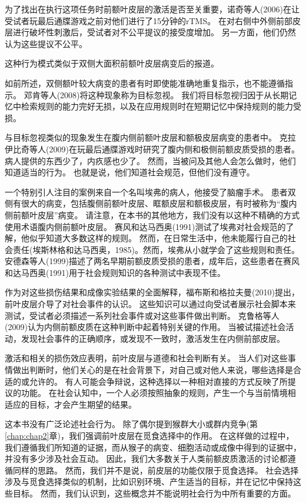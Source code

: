 为了找出在执行这项任务时前额叶皮层的激活是否至关重要，诺奇等人(2006)在让受试者玩最后通牒游戏之前对他们进行了15分钟的rTMS。
在对右侧中外侧前部皮层进行破坏性刺激后，受试者对不公平提议的接受度增加。
另一方面，他们仍然认为这些提议不公平。


这种行为模式类似于双侧大面积前额叶皮层病变后的报道。


如前所述，双侧额叶较大病变的患者有时即使能准确地重复指示，也不能遵循指示。
邓肯等人(2008)将这种现象称为目标忽视。
我们将目标忽视归因于从长期记忆中检索规则的能力完好无损，以及在应用规则时在短期记忆中保持规则的能力受损。


与目标忽视类似的现象发生在腹内侧前额叶皮层和额极皮层病变的患者中。
克拉伊比奇等人(2009)在玩最后通牒游戏时研究了腹内侧和极侧前额皮质受损的患者。
病人提供的东西少了，内疚感也少了。
然而，当被问及其他人会怎么做时，他们知道适当的行为。
也就是说，他们知道社会规范，但他们没有遵守。


一个特别引人注目的案例来自一个名叫埃弗的病人，他接受了脑瘤手术。
患者双侧有很大的病变，包括腹侧前额叶皮层、眶额皮层和额极皮层，有时被称为“腹内侧前额叶皮层”病变。
请注意，在本书的其他地方，我们没有以这种不精确的方式使用术语腹内侧前额叶皮层。
赛风和达马西奥(1991)测试了埃弗对社会规范的了解，他似乎知道大多数这样的规则。
然而，在日常生活中，他未能履行自己的社会责任(埃斯林格和达马西奥，1985)。然而，埃弗从小就学会了这些规则和责任。
安德森等人(1999)描述了两名早期前额皮质受损的患者，成年后，这些患者在赛风和达马西奥(1991)用于社会规则知识的各种测试中表现不佳。


作为对这些损伤结果和成像实验结果的全面解释，福布斯和格拉夫曼(2010)提出，前叶皮层介导了对社会事件的认识。
这些知识可以通过向受试者展示社会脚本来测试，受试者必须描述一系列社会事件或对这些事件做出判断。
克鲁格等人(2009)认为内侧前额皮质在这种判断中起着特别关键的作用。
当被试描述社会活动，发现社会事件的正确顺序，或发现不一致时，激活发生在内侧前部皮层。


激活和相关的损伤效应表明，前叶皮层与道德和社会判断有关。
当人们对这些事情做出判断时，他们关心的是在社会背景下，对自己或对他人来说，哪些选择是合适的或允许的。
有人可能会争辩说，这种选择以一种相对直接的方式反映了所提议的功能。
在社会认知中，一个人必须按照抽象的规则，产生一个与当前情境相适应的目标，才会产生期望的结果。


这本书没有广泛论述社会行为。
除了偶尔提到猴群大小或群内竞争(第\ref{chap:chap2}章)，我们强调前叶皮层在觅食选择中的作用。
在这样做的过程中，我们遵循我们所知道的证据，而从猴子的病变、细胞活动或成像中得到的证据中，并没有多少涉及社会互动。
因此，我们大多数关于人类前额皮质激活的讨论都遵循同样的思路。
然而，我们并不是说，前皮层的功能仅限于觅食选择。
社会选择涉及与觅食选择类似的机制，比如识别环境、产生适当的目标，并在记忆中保持这些目标。
然而，我们认识到，这些概念并不能说明社会行为中所有重要的方面。



